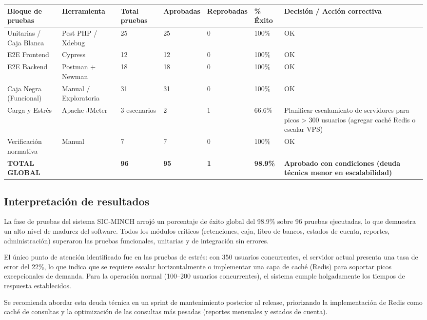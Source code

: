 \documentclass[stu]{apa7}
\begin{document}
\begin{longtable}{|L{3cm}|L{2.5cm}|C{2cm}|C{2cm}|C{2cm}|C{2cm}|L{3.5cm}|}
\hline
{}
\textbf{Bloque de pruebas} & \textbf{Herramienta} & \textbf{Total pruebas} & \textbf{Aprobadas} & \textbf{Reprobadas} & \textbf{\% Éxito} & \textbf{Decisión / Acción correctiva} \\
\hline
Unitarias / Caja Blanca & Pest PHP / Xdebug & 25 & 25 & 0 & 100\% & OK \\
\hline
E2E Frontend & Cypress & 12 & 12 & 0 & 100\% & OK \\
\hline
E2E Backend & Postman + Newman & 18 & 18 & 0 & 100\% & OK \\
\hline
Caja Negra (Funcional) & Manual / Exploratoria & 31 & 31 & 0 & 100\% & OK \\
\hline
Carga y Estrés & Apache JMeter & 3 escenarios & 2 & 1 & 66.6\% & Planificar escalamiento de servidores para picos > 300 usuarios (agregar caché Redis o escalar VPS) \\
\hline
Verificación normativa & Manual & 7 & 7 & 0 & 100\% & OK \\
\hline
{}
\textbf{TOTAL GLOBAL} & & \textbf{96} & \textbf{95} & \textbf{1} & \textbf{98.9\%} & \textbf{Aprobado con condiciones (deuda técnica menor en escalabilidad)} \\
\hline
\end{longtable}

\subsection{Interpretación de resultados}

La fase de pruebas del sistema SIC-MINCH arrojó un porcentaje de éxito global del 98.9\% sobre 96 pruebas ejecutadas, lo que demuestra un alto nivel de madurez del software. Todos los módulos críticos (retenciones, caja, libro de bancos, estados de cuenta, reportes, administración) superaron las pruebas funcionales, unitarias y de integración sin errores.

El único punto de atención identificado fue en las pruebas de estrés: con 350 usuarios concurrentes, el servidor actual presenta una tasa de error del 22\%, lo que indica que se requiere escalar horizontalmente o implementar una capa de caché (Redis) para soportar picos excepcionales de demanda. Para la operación normal (100--200 usuarios concurrentes), el sistema cumple holgadamente los tiempos de respuesta establecidos.

Se recomienda abordar esta deuda técnica en un sprint de mantenimiento posterior al release, priorizando la implementación de Redis como caché de consultas y la optimización de las consultas más pesadas (reportes mensuales y estados de cuenta).
\end{document}
